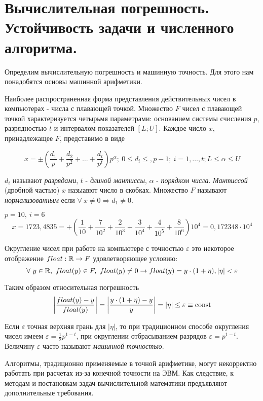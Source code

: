 \section{Вычислительная погрешность. Устойчивость задачи и численного алгоритма.}

Определим вычислительную погрешность и машинную точность.
Для этого нам понадобятся основы машинной арифметики.

Наиболее распространенная форма представления действительных чисел в
компьютерах - числа с плавающей точкой. Множество $F$ чисел с плавающей
точкой характеризуется четырьмя параметрами: основанием системы
счисления $p$, разрядностью $t$ и интервалом показателей $[L;U]$. Каждое
число $x$, принадлежащее $F$, представимо в виде

\[x=\pm\left(\frac{d_1}{p}+\frac{d_2}{p^2}+\ldots+\frac{d_t}{p^t}\right)p^{\alpha};\ 0\leq d_i\leq,p-1;\ i=1,\ldots,t;L\leq\alpha\leq U\]

$d_i$ называют \textit{разрядами}, $t$ - \textit{длиной мантиссы}, $\alpha$ - \textit{порядком числа}.
\textit{Мантиссой} (дробной частью) $x$ назыавют число в скобках.
Множество $F$ называют \textit{нормализованным} если $\forall\ x\neq0\Rightarrow d_1\neq0$.

\begin{example}
  $p=10,\ i=6$
  \[x = 1723,4835=+\left(\frac{1}{10}+\frac{7}{10^2}+\frac{2}{10^3}+\frac{3}{10^4}+\frac{4}{10^5}+\frac{8}{10^6}\right)10^4=0,172348\cdot10^4\]
\end{example}

Округление чисел при работе на компьютере с точностью $\varepsilon$ это
некоторое отображение $float:\mathbb{R} \rightarrow F$ удовлетворяющее условию:
\[\forall\ y\in\R,\ float(y)\in F,\ float(y)\neq0\rightarrow float(y)=y\cdot(1+\eta),|\eta|<\varepsilon\]

Таким образом относительная погрешность
\[\left|\frac{float(y)-y}{float(y)}\right|=\left|\frac{y\cdot(1+\eta)-y}{y}\right|=\left|\eta\right|\leq\varepsilon\equiv\mathrm{const}\]

Если $\varepsilon$ точная верхняя грань для $|\eta|$,
то при традиционном способе округления чисел имеем $\varepsilon=\frac{1}{2}p^{1-t}$,
при округлении отбрасыванием разрядов $\varepsilon=p^{1-t}$.
Величину $\varepsilon$ часто называют \textit{машинной точностью}.

Aлгоритмы, традиционно применяемые в точной арифметике,
могут некорректно работать при расчетах из-за конечной точности
на ЭВМ. Как следствие, к методам и постановкам задач вычислительной
математики предъявляют дополнительные требования.

